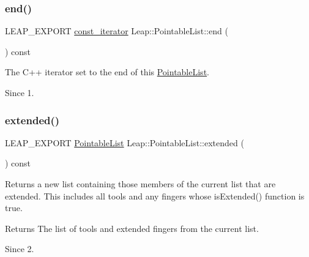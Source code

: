 \subsubsection{\texorpdfstring{end()}{end()}}
{\footnotesize\ttfamily L\+E\+A\+P\+\_\+\+E\+X\+P\+O\+RT \hyperlink{class_leap_1_1_pointable_list_a12b640b8c7e70885884a3a6ee903c21c}{const\+\_\+iterator} Leap\+::\+Pointable\+List\+::end (\begin{DoxyParamCaption}{ }\end{DoxyParamCaption}) const}

The C++ iterator set to the end of this \hyperlink{class_leap_1_1_pointable_list}{Pointable\+List}.


\begin{DoxyCodeInclude}
\end{DoxyCodeInclude}


\begin{DoxySince}{Since}
1. 
\end{DoxySince}
\mbox{\label{class_leap_1_1_pointable_list_a47919c7b8198806da5af4c7d351d83fc}} 
\subsubsection{\texorpdfstring{extended()}{extended()}}
{\footnotesize\ttfamily L\+E\+A\+P\+\_\+\+E\+X\+P\+O\+RT \hyperlink{class_leap_1_1_pointable_list}{Pointable\+List} Leap\+::\+Pointable\+List\+::extended (\begin{DoxyParamCaption}{ }\end{DoxyParamCaption}) const}

Returns a new list containing those members of the current list that are extended. This includes all tools and any fingers whose is\+Extended() function is true.

\begin{DoxyReturn}{Returns}
The list of tools and extended fingers from the current list. 
\end{DoxyReturn}
\begin{DoxySince}{Since}
2. 
\end{DoxySince}
\mbox{\label{class_leap_1_1_pointable_list_ab50430ce817b537ef2567eae2dc92f09}} 
